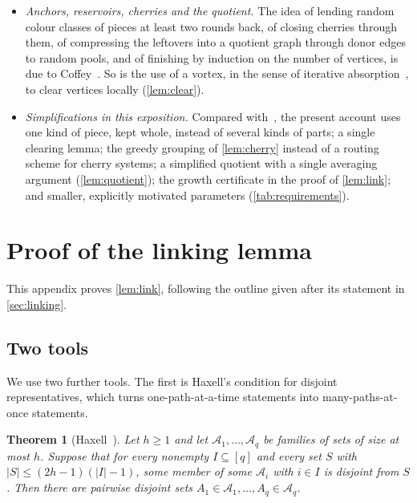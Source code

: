 \documentclass[11pt]{article}
\newtheorem{theorem}{Theorem}[section]
\theoremstyle{definition}
\theoremstyle{remark}
\numberwithin{equation}{section}
\numberwithin{figure}{section}
\numberwithin{table}{section}
\newcommand{\cA}{\mathcal{A}}
\begin{document}
\begin{itemize}[leftmargin=2em,itemsep=3pt]
and Haxell~\cite{AH} used there.  replaces~\cite[Lemma~15]{BM}
and has a standard proof.
\item \emph{Anchors, reservoirs, cherries and the quotient.} The idea of lending
random colour classes of pieces at least two rounds back, of closing cherries
through them, of compressing the leftovers into a quotient graph through
donor edges to random pools, and of finishing by induction on the number of
vertices, is due to Coffey~\cite{Cof}. So is the use of a vortex, in the sense
of iterative absorption~\cite{BKLO}, to clear vertices locally
(\cref{lem:clear}).
\item \emph{Simplifications in this exposition.} Compared with~\cite{Cof}, the
present account uses one kind of piece, kept whole, instead of several kinds of
parts; a single clearing lemma; the greedy grouping of \cref{lem:cherry}
instead of a routing scheme for cherry systems; a simplified quotient with a
single averaging argument (\cref{lem:quotient}); the growth certificate in the
proof of \cref{lem:link}; and smaller, explicitly motivated parameters
(\cref{tab:requirements}).
\end{itemize}

\appendix

\section{Proof of the linking lemma}\label{app:linking}

This appendix proves \cref{lem:link}, following the outline given after its
statement in \cref{sec:linking}.

\subsection*{Two tools}

We use two further tools. The first is Haxell's condition for disjoint
representatives, which turns one-path-at-a-time statements into
many-paths-at-once statements.

\begin{theorem}[Haxell~\cite{Hax}]\label{thm:haxell}
Let $h\ge1$ and let $\cA_1,\dots,\cA_q$ be families of sets of size at most $h$.
Suppose that for every nonempty $I\subseteq[q]$ and every set $S$ with
$|S|\le(2h-1)(|I|-1)$, some member of some $\cA_i$ with $i\in I$ is disjoint
from $S$. Then there are pairwise disjoint sets $A_1\in\cA_1,\dots,A_q\in\cA_q$.
\end{theorem}
\end{document}
